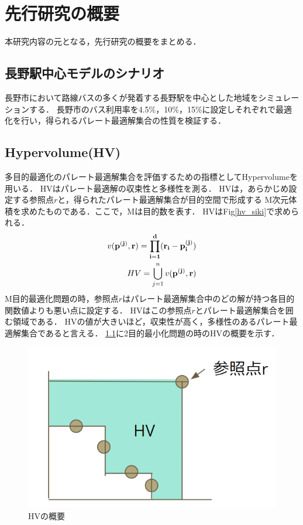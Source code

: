 \documentclass[main]{subfiles}
\begin{document}
\chapter{先行研究の概要}
    本研究内容の元となる，先行研究の概要をまとめる\cite{senkoukenkyu}．

    \section{長野駅中心モデルのシナリオ}
    長野市において路線バスの多くが発着する長野駅を中心とした地域をシミュレーションする．
    長野市のバス利用率を4.5\%，10\%，15\%に設定しそれぞれで最適化を行い，得られるパレート最適解集合の性質を検証する．

    \section{Hypervolume(HV)}
    多目的最適化のパレート最適解集合を評価するための指標としてHypervolumeを用いる\cite{hv}．
    HVはパレート最適解の収束性と多様性を測る．
    HVは，あらかじめ設定する参照点\boldmath$r$と，得られたパレート最適解集合が目的空間で形成する
    M次元体積を求めたものである．ここで，Mは目的数を表す．
    HVはFig\ref{hv_siki}で求められる．
    \begin{align}
        v(\bf{p}^{(j)}, \bf r) = \prod_{i=1}^d (r_i - p_i^{(j)}) \\
        HV = \bigcup_{j=1}^n v(\bf{p}^{(j)}, \bf r)
        \label{hv_siki}
    \end{align}
    M目的最適化問題の時，参照点\boldmath$r$はパレート最適解集合中のどの解が持つ各目的関数値よりも悪い点に設定する．
    HVはこの参照点\boldmath$r$とパレート最適解集合を囲む領域である．
    HVの値が大きいほど，収束性が高く，多様性のあるパレート最適解集合であると言える．
    \ref{hv_image}に2目的最小化問題の時のHVの概要を示す．

    \begin{figure}
        \centering
        \includegraphics[width=\linewidth]{figures/hv_image.png}
        \caption{HVの概要}
        \label{hv_image}
    \end{figure}
\end{document}
